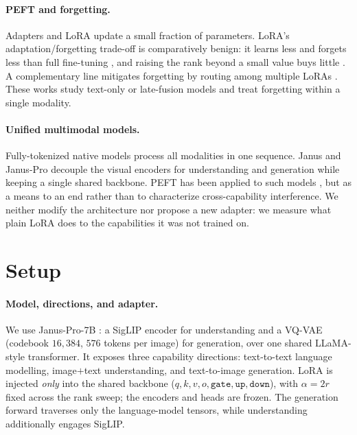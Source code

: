 \documentclass{article}
\begin{document}
\paragraph{PEFT and forgetting.}
Adapters \citep{houlsby2019parameter} and LoRA \citep{hu2022lora} update a small
fraction of parameters. LoRA's adaptation/forgetting trade-off is comparatively
benign: it learns less and forgets less than full fine-tuning
\citep{biderman2024lora}, and raising the rank beyond a small value buys little
\citep{zhang2024scalingmeetsfinetuning}. A complementary line mitigates
forgetting by routing among multiple LoRAs \citep{dou2024loramoe, wu2024mole,
li2024mixlora}. These works study text-only or late-fusion models and treat
forgetting within a single modality.

\paragraph{Unified multimodal models.}
Fully-tokenized native models \citep{chameleon2024, bachmann20244m21,
lu2024unifiedio2} process all modalities in one sequence. Janus and Janus-Pro
\citep{wu2024janus, januspro} decouple the visual encoders for understanding and
generation while keeping a single shared backbone. PEFT has been applied to such
models \citep{chern2024anole, serra2024narrowgate, wang2025vora}, but as a means
to an end rather than to characterize cross-capability interference. We neither
modify the architecture nor propose a new adapter: we measure what plain LoRA
does to the capabilities it was not trained on.

\section{Setup}
\paragraph{Model, directions, and adapter.}
We use Janus-Pro-7B \citep{januspro}: a SigLIP encoder for understanding and a
VQ-VAE (codebook $16{,}384$, $576$ tokens per image) for generation, over one
shared LLaMA-style transformer. It exposes three capability directions:
text-to-text language modelling, image$+$text understanding, and text-to-image
generation. LoRA is injected \emph{only} into the shared backbone
($q,k,v,o,\texttt{gate},\texttt{up},\texttt{down}$), with $\alpha=2r$ fixed
across the rank sweep; the encoders and heads are frozen. The generation forward
traverses only the language-model tensors, while understanding additionally
engages SigLIP.
\end{document}
